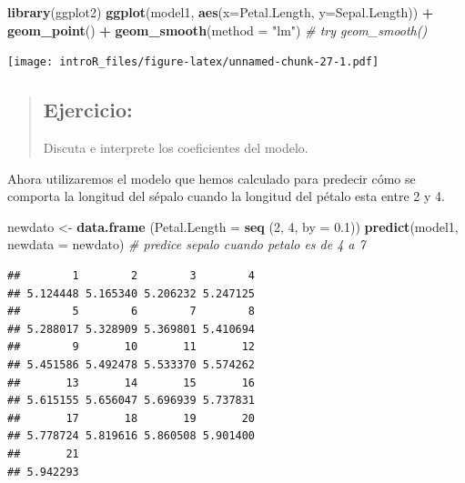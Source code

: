 \documentclass[
]{book}
\newenvironment{Shaded}{\begin{snugshade}}{\end{snugshade}}
\newcommand{\CommentTok}[1]{\textcolor[rgb]{0.56,0.35,0.01}{\textit{#1}}}
\newcommand{\DataTypeTok}[1]{\textcolor[rgb]{0.13,0.29,0.53}{#1}}
\newcommand{\DecValTok}[1]{\textcolor[rgb]{0.00,0.00,0.81}{#1}}
\newcommand{\FloatTok}[1]{\textcolor[rgb]{0.00,0.00,0.81}{#1}}
\newcommand{\KeywordTok}[1]{\textcolor[rgb]{0.13,0.29,0.53}{\textbf{#1}}}
\newcommand{\NormalTok}[1]{#1}
\newcommand{\OperatorTok}[1]{\textcolor[rgb]{0.81,0.36,0.00}{\textbf{#1}}}
\newcommand{\StringTok}[1]{\textcolor[rgb]{0.31,0.60,0.02}{#1}}
\begin{document}
\begin{Shaded}
\begin{Highlighting}[]
\KeywordTok{library}\NormalTok{(ggplot2)}
\KeywordTok{ggplot}\NormalTok{(model1, }\KeywordTok{aes}\NormalTok{(}\DataTypeTok{x=}\NormalTok{Petal.Length, }\DataTypeTok{y=}\NormalTok{Sepal.Length)) }\OperatorTok{+}\StringTok{ }\KeywordTok{geom_point}\NormalTok{() }\OperatorTok{+}\StringTok{ }
\StringTok{  }\KeywordTok{geom_smooth}\NormalTok{(}\DataTypeTok{method =} \StringTok{"lm"}\NormalTok{) }\CommentTok{# try geom_smooth()}
\end{Highlighting}
\end{Shaded}

\texttt{[image: introR\_files/figure-latex/unnamed-chunk-27-1.pdf]}

\begin{quote}
\hypertarget{ejercicio-3}{%
\subsection{Ejercicio:}\label{ejercicio-3}}

Discuta e interprete los coeficientes del modelo.
\end{quote}

Ahora utilizaremos el modelo que hemos calculado para predecir cómo se comporta la longitud del sépalo cuando la longitud del pétalo esta entre 2 y 4.

\begin{Shaded}
\begin{Highlighting}[]
\NormalTok{newdato <-}\StringTok{ }\KeywordTok{data.frame}\NormalTok{ (}\DataTypeTok{Petal.Length =} \KeywordTok{seq}\NormalTok{ (}\DecValTok{2}\NormalTok{, }\DecValTok{4}\NormalTok{, }\DataTypeTok{by =} \FloatTok{0.1}\NormalTok{))}
\KeywordTok{predict}\NormalTok{(model1, }\DataTypeTok{newdata =}\NormalTok{ newdato) }\CommentTok{# predice sepalo cuando petalo es de 4 a 7}
\end{Highlighting}
\end{Shaded}

\begin{verbatim}
##        1        2        3        4 
## 5.124448 5.165340 5.206232 5.247125 
##        5        6        7        8 
## 5.288017 5.328909 5.369801 5.410694 
##        9       10       11       12 
## 5.451586 5.492478 5.533370 5.574262 
##       13       14       15       16 
## 5.615155 5.656047 5.696939 5.737831 
##       17       18       19       20 
## 5.778724 5.819616 5.860508 5.901400 
##       21 
## 5.942293
\end{verbatim}
\end{document}
